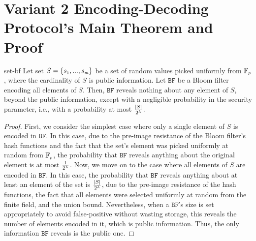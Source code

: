 
\section{Variant 2 Encoding-Decoding Protocol's Main Theorem and Proof}\label{sec::Variant-2-Theorem-proof}

\begin{reptheorem}{set-bf}
Let set $S=\{s_{\scriptscriptstyle 1},..., s_{\scriptscriptstyle m}\}$ be a set of random values picked uniformly from $\mathbb{F}_{\scriptscriptstyle p}$, where the cardinality of $S$ is  public information. Let $\mathtt{BF}$ be a Bloom filter encoding all elements of   $S$. Then,  $\mathtt{BF}$ reveals nothing about any element of $S$, beyond the public information, except with a negligible probability in the security parameter, i.e., with a probability at most $\frac{|S|}{2^{\scriptscriptstyle \lambda}}$. 
\end{reptheorem}

\begin{proof}
First, we consider the simplest case where only a single element  of $S$ is encoded in $\mathtt{BF}$. In this case, due to the pre-image resistance of the Bloom filter's hash functions and the fact that the set's element was picked uniformly at random from $\mathbb{F}_{\scriptscriptstyle p}$, the probability that $\mathtt{BF}$ reveals anything about the original element is at most $\frac{1}{2^{\scriptscriptstyle \lambda}}$. Now, we move on to the  case where all elements of $S$ are encoded in $\mathtt{BF}$. In this case, the probability that $\mathtt{BF}$ reveals anything about at least an element of the set is $\frac{|S|}{2^{\scriptscriptstyle \lambda}}$, due to  the pre-image resistance of the hash functions,  the fact that all elements were selected  uniformly at random from the finite field, and the union bound. Nevertheless, when a $\mathtt{BF}$'s size is set appropriately to avoid false-positive without wasting storage, this reveals the number of elements encoded in it, which is public information.  Thus, the only information $\mathtt{BF}$ reveals is the public one.  
\end{proof}